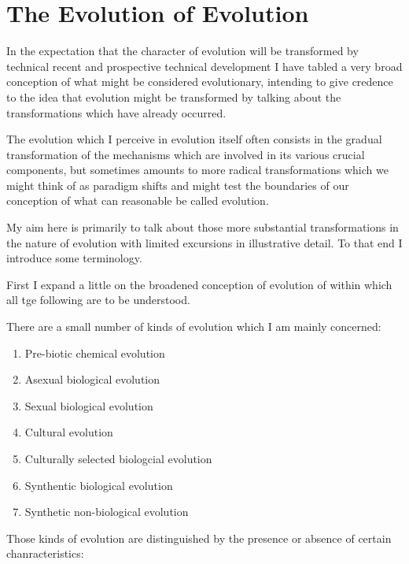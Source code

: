  \chapter{The Evolution of Evolution}\label{EvolutionOfEvolution}

 In the expectation that the character of evolution will be transformed by technical recent and prospective technical development I have tabled a very broad conception of what might be considered evolutionary, intending to give credence to the idea that evolution might be transformed by talking about the transformations which have already occurred.

 The evolution which I perceive in evolution itself often consists in the gradual transformation of the mechanisms which are involved in its various crucial components, but sometimes amounts to more radical transformations which we might think of as paradigm shifts and might test the boundaries of our conception of what can reasonable be called evolution.

 My aim here is primarily to talk about those more substantial transformations in the nature of evolution with limited excursions in illustrative detail.
 To that end I introduce some terminology.

 First I expand a little on the broadened conception of evolution of within which all tge following are to be understood.



 There are a small number of kinds of evolution which I am mainly concerned:

\renewcommand{\theenumi}{\Alph{enumi}}

\begin{enumerate}
\item Pre-biotic chemical evolution
\item Asexual biological evolution
\item Sexual biological evolution
\item Cultural evolution
\item Culturally selected biologcial evolution
\item Synthentic biological evolution
\item Synthetic non-biological evolution
\end{enumerate}

 Those kinds of evolution are distinguished by the presence or absence of certain chanracteristics:

 \renewcommand{\theenumi}{\alph{enumi}}

